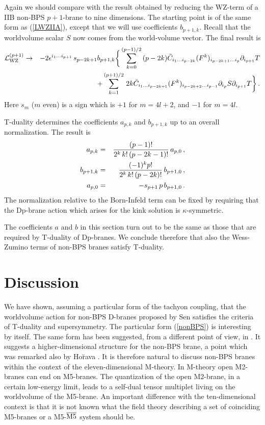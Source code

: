 \documentclass[12pt,a4paper]{article}
\begin{document}
Again we should compare with the result obtained by reducing the WZ-term of
 a IIB non-BPS $p+1$-brane to nine dimensions.
 The starting point is of the same form as (\ref{LWZIIA}), except that we
 will use coefficients $b_{p+1,k}$.
 Recall that the worldvolume
 scalar $S$ now comes from the world-volume vector. The final result is
\begin{eqnarray}
     {\cal L}^{(p+1)}_{\rm WZ}&\to&
 - 2\epsilon^{i_1\ldots i_{p+1}} \,s_{p-2k+1} b_{p+1,k}\bigg\{
    \sum_{k=0}^{(p-1)/2} \,
    (p-2k)\tilde C_{i_1\ldots i_{p-2k}} (F^k)_{i_{p-2k+1}\ldots i_p}
     \partial_{i_{p+1}}T
   \nonumber\\
  &&\ + \sum_{k=1}^{(p+1)/2}\,2k
 \tilde C_{i_1\ldots i_{p-2k+1}}
   (F^k)_{i_{p-2k+2}\ldots i_{p-1}}\partial_{i_p}S
     \partial_{i_{p+1}}T\bigg\} \,.
\end{eqnarray}
Here $s_m$ ($m$ even) is a sign which is $+1$ for $m=4l+2$, and $-1$ for
 $m=4l$.

T-duality determines the coefficients $a_{p,k}$ and $b_{p+1,k}$ up to
 an overall normalization.
 The result is
\begin{eqnarray}
  a_{p,k} &=& {(p-1)!\over 2^k\, k!\, (p-2k-1)!}\, a_{p,0}\,,
  \nonumber\\
  b_{p+1,k}&=& {(-1)^k p!\over 2^k\, k! \,(p-2k)!}\, b_{p+1,0}\,,
  \nonumber\\
  a_{p,0} &=& -s_{p+1}\, p\, b_{p+1,0}\,.
\end{eqnarray}
The normalization relative to the Born-Infeld term can be fixed
 by requiring that the Dp-brane action
 which arises for the kink solution is $\kappa$-symmetric.

The coefficients $a$ and $b$ in this section turn out to be the same
 as those that are required by T-duality of Dp-branes. We conclude therefore
 that also the Wess-Zumino terms of non-BPS branes satisfy T-duality.

\section{Discussion}

We have shown, assuming a particular form of the tachyon coupling,
that the worldvolume action for non-BPS D-branes proposed by Sen
satisfies the criteria of T-duality and supersymmetry.
The particular form (\ref{nonBPS}) is interesting by itself.
The same form has been suggested, from a different point of view,
in \cite{Gar}. It
 suggests
 a higher-dimensional structure for the non-BPS brane, a point which was
 remarked also by Ho\u rava \cite{Ho1}. It is therefore natural to discuss
non-BPS branes within the context of the eleven-dimensional M-theory.
In M-theory open M2-branes can end on M5-branes. The quantization of
the open M2-brane, in a certain low-energy limit, leads to a self-dual
tensor multiplet living on the worldvolume of the M5-brane.
An important difference with the ten-dimensional context is that
it is not
known what the field theory  describing a set of coinciding M5-branes
or a M5-$\overline{\rm M5}$ system should be.
\end{document}
